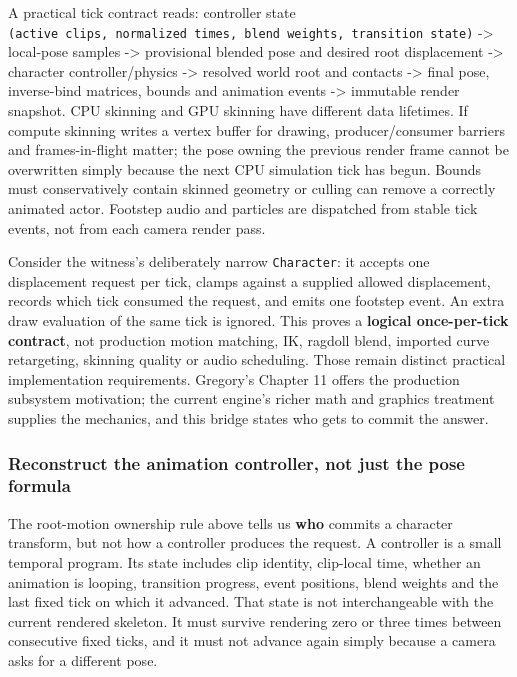 A practical tick contract reads: controller state \texttt{(active\ clips,\ normalized\ times,\ blend\ weights,\ transition\ state)} -\textgreater{} local-pose samples -\textgreater{} provisional blended pose and desired root displacement -\textgreater{} character controller/physics -\textgreater{} resolved world root and contacts -\textgreater{} final pose, inverse-bind matrices, bounds and animation events -\textgreater{} immutable render snapshot. CPU skinning and GPU skinning have different data lifetimes. If compute skinning writes a vertex buffer for drawing, producer/consumer barriers and frames-in-flight matter; the pose owning the previous render frame cannot be overwritten simply because the next CPU simulation tick has begun. Bounds must conservatively contain skinned geometry or culling can remove a correctly animated actor. Footstep audio and particles are dispatched from stable tick events, not from each camera render pass.

Consider the witness's deliberately narrow \texttt{Character}: it accepts one displacement request per tick, clamps against a supplied allowed displacement, records which tick consumed the request, and emits one footstep event. An extra draw evaluation of the same tick is ignored. This proves a \textbf{logical once-per-tick contract}, not production motion matching, IK, ragdoll blend, imported curve retargeting, skinning quality or audio scheduling. Those remain distinct practical implementation requirements. Gregory's Chapter 11 offers the production subsystem motivation; the current engine's richer math and graphics treatment supplies the mechanics, and this bridge states who gets to commit the answer.

\subsubsection{Reconstruct the animation controller, not just the pose formula}\label{06-engine-ii-ch040-reconstruct-the-animation-controller-not-just-the-pose-formula}

The root-motion ownership rule above tells us \textbf{who} commits a character transform, but not how a controller produces the request. A controller is a small temporal program. Its state includes clip identity, clip-local time, whether an animation is looping, transition progress, event positions, blend weights and the last fixed tick on which it advanced. That state is not interchangeable with the current rendered skeleton. It must survive rendering zero or three times between consecutive fixed ticks, and it must not advance again simply because a camera asks for a different pose.

